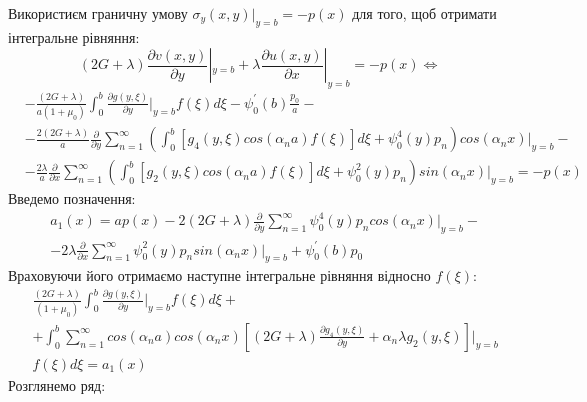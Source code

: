 Використиєм граничну умову $\sigma_y(x, y) |_{y=b} = -p(x)$ для того, щоб отримати інтегральне рівняння:
\begin{equation*}
    (2G + \lambda)\frac{\partial v(x,y)}{\partial y}|_{y=b} + \lambda\frac{\partial u(x,y)}{\partial x}|_{y=b} = -p(x) \Leftrightarrow
\end{equation*}
\begin{align*}
    &-\frac{(2G + \lambda)}{a(1+\mu_0)} \int_{0}^{b}\frac{\partial g(y, \xi)}{\partial y}|_{y=b} f(\xi) d\xi - \psi_0^{'}(b) \frac{p_0}{a} - \\
    &- \frac{2(2G + \lambda)}{a} \frac{\partial}{\partial y} \sum_{n=1}^{\infty} \left( \int_0^b \left[g_4(y, \xi) cos(\alpha_n a) f(\xi) \right]d\xi + \psi_0^{4}(y) p_n \right) cos(\alpha_n x)|_{y=b} - \\
    & -\frac{2\lambda}{a} \frac{\partial}{\partial x} \sum_{n=1}^{\infty} \left( \int_0^b \left[g_2(y, \xi)cos(\alpha_n a) f(\xi) \right]d\xi + \psi_0^2(y) p_n \right) sin(\alpha_n x)|_{y=b} = -p(x)
\end{align*}
Введемо позначення:
\begin{align}
    &a_1(x) = a p(x) - 2(2G + \lambda) \frac{\partial}{\partial y} \sum_{n=1}^{\infty} \psi_0^{4}(y) p_n cos(\alpha_n x)|_{y=b} - \nonumber \\
    &- 2\lambda \frac{\partial}{\partial x} \sum_{n=1}^{\infty}\psi_0^2(y) p_n sin(\alpha_n x)|_{y=b} + \psi_0^{'}(b) p_0
\end{align}
Враховуючи його отримаємо наступне інтегральне рівняння відносно $f(\xi)$:
\begin{align}\label{int_gen}
    &\frac{(2G + \lambda)}{(1+\mu_0)} \int_{0}^{b}\frac{\partial g(y, \xi)}{\partial y}|_{y=b} f(\xi) d\xi + \nonumber \\ 
    &+ \int_{0}^{b} \sum_{n=1}^{\infty} cos(\alpha_n a) cos(\alpha_n x) \left[(2G + \lambda) \frac{\partial g_4(y, \xi)}{\partial y} + \alpha_n \lambda g_2(y, \xi) \right]|_{y=b} \nonumber \\
    &f(\xi) d\xi = a_1(x)
\end{align}
Розглянемо ряд:
